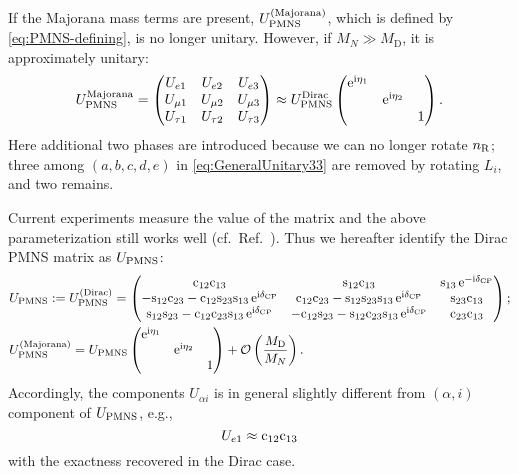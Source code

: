 \documentclass[CheatSheet]{subfiles}
\newcommand\MD[1][]{M_{\mathrm{D}#1}}
\newcommand\MN[1][]{M_{N#1}}
\begin{document}
If the Majorana mass terms are present, $U_{\mathrm{PMNS}}^{\text{(Majorana)}}$, which is defined by \cref{eq:PMNS-defining}, is no longer unitary.
However, if $\MN\gg\MD$, it is approximately unitary:
\begin{equation}
   U_{\mathrm{PMNS}}^{\text{Majorana}}=
\begin{pmatrix}
 U_{e1} & U_{e2} & U_{e3}\\
 U_{\mu1} & U_{\mu2} & U_{\mu3}\\
 U_{\tau1} & U_{\tau2} & U_{\tau3}
 \end{pmatrix}
\approx
U_{\mathrm{PMNS}}^{\text{Dirac}}
\begin{pmatrix}\mathop{}\!\mathrm{e}^{\mathrm{i}\eta_1} \\ & \mathop{}\!\mathrm{e}^{\mathrm{i}\eta_2}\\&&1\end{pmatrix}.
\end{equation}
Here additional two phases are introduced because we can no longer rotate $n_{\mathrm{R}}$; three among $(a,b,c,d,e)$ in \cref{eq:GeneralUnitary33} are removed by rotating $L_i$, and two remains.

Current experiments measure the value of the matrix and the above parameterization still works well (cf.~Ref.~\cite{NUFIT}).
Thus we hereafter identify the Dirac PMNS matrix as $U_{\mathrm{PMNS}}$:
\begin{align}
 &U\w{PMNS}:=U\w{PMNS}^{\text{(Dirac)}}=
 \pmat{
 \co{12} \co{13} & \si{12} \co{13} & \si{13} \ee^{-\ii\delta\w{CP}}\\
 -\si{12} \co{23} - \co{12} \si{23} \si{13} \ee^{\ii\delta\w{CP}}& \co{12} \co{23} - \si{12}\si{23}\si{13} \ee^{\ii\delta\w{CP}}& \si{23}\co{13}\\
  \si{12}\si{23} - \co{12} \co{23} \si{13}\ee^{\ii\delta\w{CP}} & -\co{12}\si{23}-\si{12}\co{23}\si{13}\ee^{\ii\delta\w{CP}} & \co{23} \co{13}
};\\
 &U\w{PMNS}^{\text{(Majorana)}} = U\w{PMNS}\pmat{\ee^{\ii\eta_1} \\ & \ee^{\ii\eta_2}\\&&1}
+\Order\left(\frac{\MD}{\MN}\right).
\end{align}
Accordingly, the components $U_{\alpha i}$ is in general slightly different from $(\alpha,i)$ component of $U_{\mathrm{PMNS}}$, e.g.,
\begin{equation*}
 U_{e1}\approx \mathrm{c}_{12}\mathrm{c}_{13}
\end{equation*}
with the exactness recovered in the Dirac case.
\end{document}
